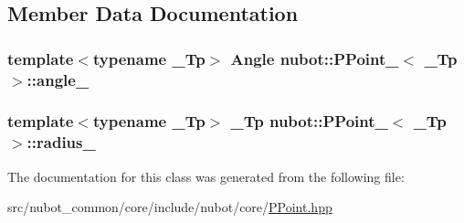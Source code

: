 \subsection{Member Data Documentation}
\hypertarget{classnubot_1_1PPoint___a649d2bc79c800be47c0a7a97de34b3b2}{
\subsubsection[{angle\-\_\-}]{\setlength{\rightskip}{0pt plus 5cm}template$<$typename \-\_\-\-Tp$>$ {\bf Angle} {\bf nubot\-::\-P\-Point\-\_\-}$<$ \-\_\-\-Tp $>$\-::angle\-\_\-}}\label{classnubot_1_1PPoint___a649d2bc79c800be47c0a7a97de34b3b2}
\hypertarget{classnubot_1_1PPoint___ab12f8f807fa1dc17ab89fd900fd1ed70}{
\subsubsection[{radius\-\_\-}]{\setlength{\rightskip}{0pt plus 5cm}template$<$typename \-\_\-\-Tp$>$ \-\_\-\-Tp {\bf nubot\-::\-P\-Point\-\_\-}$<$ \-\_\-\-Tp $>$\-::radius\-\_\-}}\label{classnubot_1_1PPoint___ab12f8f807fa1dc17ab89fd900fd1ed70}


The documentation for this class was generated from the following file\-:\begin{DoxyCompactItemize}
\item 
src/nubot\-\_\-common/core/include/nubot/core/\hyperlink{PPoint_8hpp}{P\-Point.\-hpp}\end{DoxyCompactItemize}
